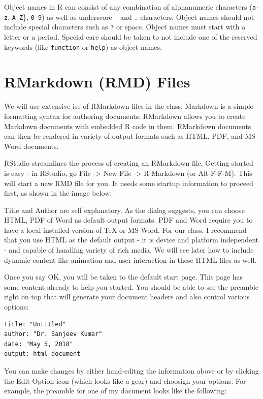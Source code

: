 \documentclass[]{krantz}
\theoremstyle{definition}
\theoremstyle{definition}
\theoremstyle{definition}
\theoremstyle{remark}
\begin{document}
Object names in R can consist of any combination of alphanumeric
characters (\texttt{a-z}, \texttt{A-Z}\}, \texttt{0-9}) as well as
underscore \texttt{-} and \texttt{.} characters. Object names should not
include special characters such as \texttt{?} or space. Object names
must start with a letter or a period. Special care should be taken to
not include one of the reserved keywords (like \texttt{function} or
\texttt{help}) as object names.

\section{RMarkdown (RMD) Files}\label{rmarkdown-rmd-files}

We will use extensive ise of RMarkdown files in the class. Markdown is a
simple formatting syntax for authoring documents. RMarkdown allows you
to create Markdown documents with embedded R code in them. RMarkdown
documents can then be rendered in variety of output formats such as
HTML, PDF, and MS Word documents.

RStudio streamlines the process of creating an RMarkdown file. Getting
started is easy - in RStudio, go File -\textgreater{} New File
-\textgreater{} R Markdown (or Alt-F-F-M). This will start a new RMD
file for you. It needs some startup information to proceed first, as
shown in the image below:

Title and Author are self explanatory. As the dialog suggests, you can
choose HTML, PDF of Word as default output formats. PDF and Word require
you to have a local installed version of TeX or MS-Word. For our class,
I recommend that you use HTML as the default output - it is device and
platform independent - and capable of handling variety of rich media. We
will see later how to include dynamic content like animation and user
interaction in these HTML files as well.

Once you say OK, you will be taken to the default start page. This page
has some content already to help you started. You should be able to see
the preamble right on top that will generate your document headers and
also control various options:

\begin{verbatim}
title: "Untitled"
author: "Dr. Sanjeev Kumar"
date: "May 5, 2018"
output: html_document
\end{verbatim}

You can make changes by either hand-editng the information above or by
clicking the Edit Option icon (which looks like a gear) and choosign
your options. For example, the preamble for one of my document looks
like the following:
\end{document}
